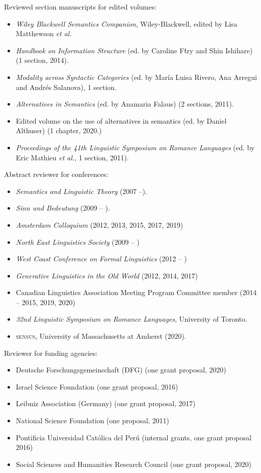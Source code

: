 \documentclass[11pt]{article}
\begin{document}
Reviewed section manuscripts for edited volumes: 
\begin{itemize}
\item[] \textit{Wiley Blackwell Semantics Companion}, Wiley-Blackwell, edited by Lisa Matthewson \textit{et al.}
\item[] \textit{Handbook on Information Structure} (ed. by Caroline F\'try and Shin Ishihare) (1 section, 2014).
\item[] \textit{Modality across Syntactic Categories} (ed. by Mar\'ia Luisa Rivero, Ana Arregui and Andr\'es Salanova), 1 section.
\item[] \textit{Alternatives in Semantics} (ed. by Anamaria Falaus) (2
  sections, 2011).
  \item [] Edited volume on the use of alternatives in semantics (ed. by Daniel Althuser) (1 chapter, 2020.)
\item[] \textit{Proceedings of the 41th Linguistic Symposium on
    Romance Languages} (ed. by Eric Mathieu \textit{et al.}, 1
  section, 2011).
\end{itemize}


Abstract reviewer for conferences:

\begin{itemize}
\item[] \textit{Semantics and Linguistic Theory} (2007 --).
\item[] \textit{Sinn und Bedeutung} (2009 -- ).
\item [] \textit{Amsterdam Colloquium} (2012, 2013, 2015, 2017, 2019)
\item[] \textit{North East Linguistics Society} (2009 -- )
\item[] \textit{West Coast Conference on Formal Linguistics} (2012 -- )
\item[] \textit{Generative Linguistics in the Old World} (2012, 2014, 2017)
\item[] Canadian Linguistics Association Meeting Program Committee member (2014 -- 2015, 2019, 2020)
\item[] \textit{32nd Linguistic Symposium on Romance Languages}, University of Toronto.
\item[] \textsc{sensus}, University of Massachusetts at Amherst (2020).
\end{itemize}


Reviewer for funding agencies:

\begin{itemize}
  \item[] Deutsche Forschungsgemeinschaft (DFG) (one grant proposal, 2020)
  \item[] Israel Science Foundation (one grant proposal, 2016)
  \item[] Leibniz Association (Germany) (one grant proposal, 2017)
  \item[] National Science Foundation (one proposal, 2011)
  \item[] Pontificia Universidad Cat\'olica del Per\'u (internal grants, one grant proposal 2016)
  \item[] Social Sciences and Humanities Research Council (one grant proposal, 2020)
  \end{itemize}
\end{document}
